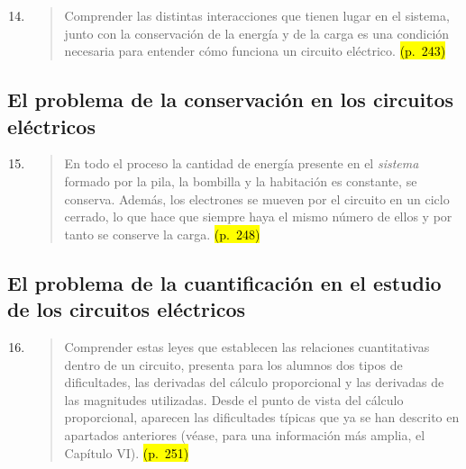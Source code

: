 \documentclass{article}
\begin{document}
\begin{enumerate}
  \setcounter{enumi}{13}
  \item
  \begin{quote}
  Comprender las distintas interacciones que tienen lugar en el sistema, junto con la conservación de la energía y de la carga es una condición necesaria para entender cómo funciona un circuito eléctrico. \hl{(p.~243)}
  \end{quote}
\end{enumerate}

\subsection*{El problema de la conservación en los circuitos eléctricos}

\begin{enumerate}
  \setcounter{enumi}{14}
  \item
  \begin{quote}
  En todo el proceso la cantidad de energía presente en el \textit{sistema} formado por la pila, la bombilla y la habitación es constante, se conserva. Además, los electrones se mueven por el circuito en un ciclo cerrado, lo que hace que siempre haya el mismo número de ellos y por tanto se conserve la carga. \hl{(p.~248)}
  \end{quote}
\end{enumerate}

\subsection*{El problema de la cuantificación en el estudio de los circuitos eléctricos}

\begin{enumerate}
  \setcounter{enumi}{15}
  \item
  \begin{quote}
  Comprender estas leyes que establecen las relaciones cuantitativas dentro de un circuito, presenta para los alumnos dos tipos de dificultades, las derivadas del cálculo proporcional y las derivadas de las magnitudes utilizadas. Desde el punto de vista del cálculo proporcional, aparecen las dificultades típicas que ya se han descrito en apartados anteriores (véase, para una información más amplia, el Capítulo VI). \hl{(p.~251)}
  \end{quote}
\end{enumerate}
\end{document}
